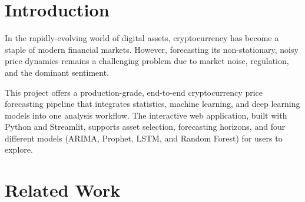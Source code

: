 \documentclass[12pt,a4paper]{report}
\begin{document}
\chapter*{Introduction}

In the rapidly-evolving world of digital assets, cryptocurrency has become a staple of modern financial markets. However, forecasting its non-stationary, noisy price dynamics remains a challenging problem due to market noise, regulation, and the dominant sentiment.

This project offers a production-grade, end-to-end cryptocurrency price forecasting pipeline that integrates statistics, machine learning, and deep learning models into one analysis workflow. The interactive web application, built with Python and Streamlit, supports asset selection, forecasting horizons, and four different models (ARIMA, Prophet, LSTM, and Random Forest) for users to explore.


\chapter*{Related Work}
\end{document}

